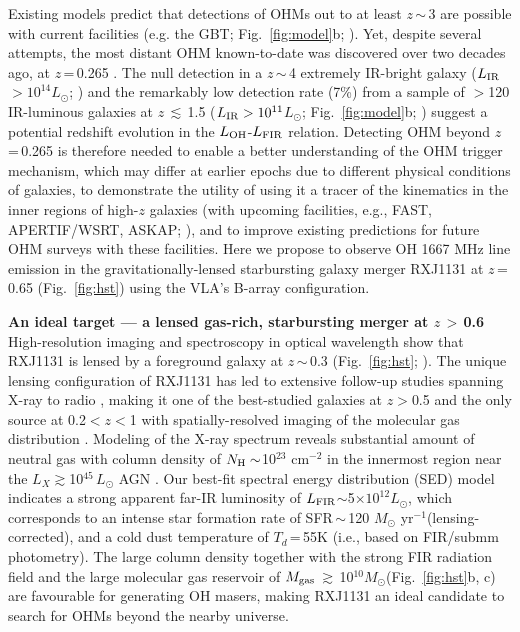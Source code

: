 \documentclass[letterpaper,11pt]{article}
\newcommand{\Lsun}{\mbox{$L_{\odot}$}\xspace}
\newcommand{\Msun}{\mbox{$M_{\odot}$}\xspace}
\newcommand{\LIR}{\mbox{$L_{\rm IR}$}\xspace}
\newcommand{\LFIR}{\mbox{$L_{\rm FIR}$}\xspace}
\newcommand{\LOH}{$L_{\rm OH}$\xspace}
\newcommand{\pmOne}{\mbox{$^{-1}$}\xspace}
\newcommand{\Fig}[1]{Fig.~\ref{fig:#1}}
\newcommand{\E}[1]{\mbox{$\times10^{#1}$}}
\newcommand{\eq}{\,=\,}
\newcommand{\ssim}{\,$\sim$\,}
\begin{document}
\noindent Existing models predict that detections of
OHMs out to at least $z$\ssim3 are possible with current facilities (e.g. the GBT; \Fig{model}b; \citealt{Darling02b_LF}).
Yet, despite several attempts,
the most distant OHM known-to-date was discovered over two decades ago, at $z$\eq0.265 \citep{Baan92a}.
The null detection in a $z$\ssim4 extremely IR-bright galaxy (\LIR$>10^{14}$\Lsun; \citealt{Ivison06a}) and
the remarkably low detection rate (7\%) from a sample of $>$120 IR-luminous galaxies
at $z$\,$\lesssim$\,1.5 ($L_{\rm IR}>10^{11}$\Lsun; \Fig{model}b; \citealt{Willett12a})
suggest a potential redshift evolution in the \LOH-\LFIR relation.
Detecting OHM beyond $z$\eq0.265 is therefore needed to enable a better understanding of the
OHM trigger mechanism, which may differ at earlier epochs due to different physical conditions of galaxies,
to demonstrate the utility of using it a tracer of the kinematics in the inner regions of high-$z$ galaxies (with upcoming facilities,
e.g., FAST, APERTIF/WSRT, ASKAP; \citealt[][]{Zhang14b}),
and to improve existing predictions for future OHM surveys with these facilities.
Here we propose to observe OH 1667 MHz line emission in the
gravitationally-lensed starbursting galaxy merger
RXJ1131 at $z$\eq0.65 (\Fig{hst}) using the VLA's B-array configuration.

\noindent \textbf{An ideal target --- a lensed gas-rich, starbursting merger at $z$\,$>$\,0.6}\\
\noindent High-resolution imaging and spectroscopy in optical wavelength show that RXJ1131 is
lensed by a foreground galaxy at $z$\ssim0.3 (\Fig{hst}; \citealt{Sluse03a}).
The unique lensing configuration of RXJ1131 has led to extensive follow-up studies spanning X-ray to radio \citep[\Fig{hst}e; e.g.,][]{Claeskens06a, Sluse07a, Leung17a},
making it one of the best-studied galaxies at $z$$>$0.5 and
the only source at 0.2$<$$z$$<$1 with spatially-resolved imaging of the molecular gas distribution \citep{Leung17a}.
Modeling of the X-ray spectrum reveals substantial amount of neutral gas with column density of
$N_{\rm H}\sim$10$^{23}$ cm$^{-2}$ in the innermost region near 
the $L_X$$\gtrsim$10$^{45}$\,\Lsun AGN \citep{Pooley07a, Reis14a}.
Our best-fit spectral energy distribution (SED) model indicates
a strong apparent far-IR luminosity of \LFIR$\sim$5\E{12}\Lsun, which corresponds to
an intense star formation rate of SFR\ssim120 \Msun yr\pmOne (lensing-corrected), and a cold dust temperature of $T_{d}$\eq55K
(i.e., based on FIR/submm photometry).
The large column density together with the strong FIR radiation field %
and the large molecular gas reservoir of $M_{\rm gas}$\,$\gtrsim$\,10$^{10}$\Msun (\Fig{hst}b, c)
are favourable for generating OH masers, making RXJ1131 an ideal candidate
to search for OHMs beyond the nearby universe. 
\end{document}
